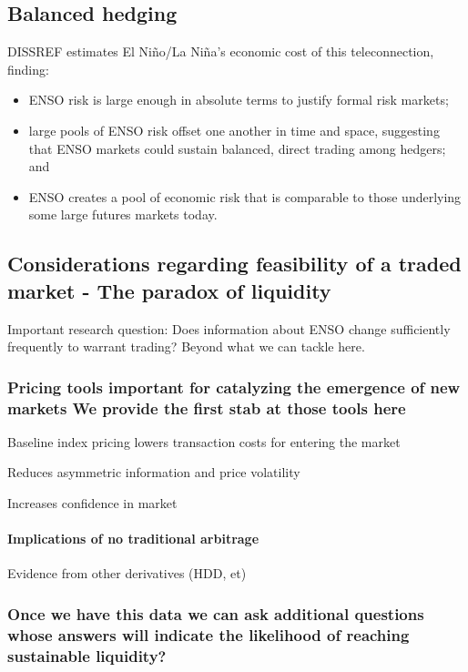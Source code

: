 \documentclass[authoryear]{article}
\begin{document}
\subsection{Balanced hedging}

DISSREF estimates El Ni\~no/La Ni\~na's economic cost of this teleconnection, finding:
\begin{itemize} 
\item ENSO risk is large enough in absolute terms to justify formal risk markets;
\item large pools of ENSO risk offset one another in time and space, suggesting that ENSO markets could sustain balanced, direct trading among hedgers; and 
\item ENSO creates a pool of economic risk that is comparable to those underlying some large futures markets today.
\end{itemize}

\subsection{Considerations regarding feasibility of a traded market - The paradox of liquidity}
Important research question: Does information about ENSO change sufficiently frequently to warrant trading? Beyond what we can tackle here.

\subsubsection{Pricing tools important for catalyzing the emergence of new markets
We provide the first stab at those tools here}

Baseline index pricing lowers transaction costs for entering the market

Reduces asymmetric information and price volatility

Increases confidence in market

\paragraph{Implications of no traditional arbitrage}
Evidence from other derivatives (HDD, et)

\subsubsection{Once we have this data we can ask additional questions whose answers will indicate the likelihood of reaching sustainable liquidity?}
\end{document}
